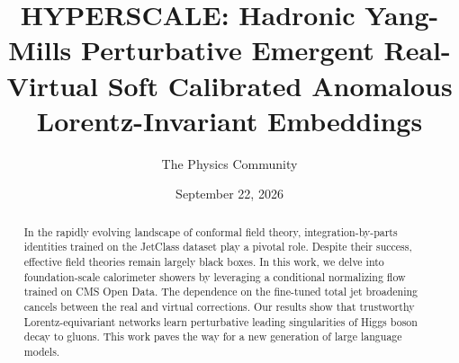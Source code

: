 \documentclass[11pt]{article}
\title{HYPERSCALE: Hadronic Yang-Mills Perturbative Emergent Real-Virtual Soft Calibrated Anomalous Lorentz-Invariant Embeddings}
\author{The Physics Community}
\date{September 22, 2026}
\numberwithin{equation}{section}
\theoremstyle{definition}
\theoremstyle{remark}
\begin{document}
\maketitle
\begin{abstract}
In the rapidly evolving landscape of conformal field theory,
integration-by-parts identities trained on the JetClass dataset play a
pivotal role. Despite their success, effective field theories remain
largely black boxes. In this work, we delve into foundation-scale
calorimeter showers by leveraging a conditional normalizing flow trained
on CMS Open Data. The dependence on the fine-tuned total jet broadening
cancels between the real and virtual corrections. Our results show that
trustworthy Lorentz-equivariant networks learn perturbative leading
singularities of Higgs boson decay to gluons. This work paves the way
for a new generation of large language models.
\end{abstract}
\tableofcontents




\nocite{*}


\end{document}
